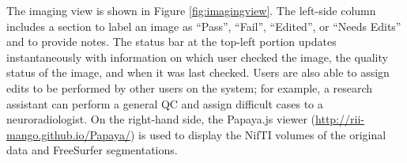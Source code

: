 The imaging view is shown in Figure \ref{fig:imagingview}. The left-side column includes a section to label an image as ``Pass'', ``Fail'', ``Edited'', or ``Needs Edits'' and to provide notes. The status bar at the top-left portion updates instantaneously with information on which user checked the image, the quality status of the image, and when it was last checked. Users are also able to assign edits to be performed by other users on the system; for example, a research assistant can perform a general QC and assign difficult cases to a neuroradiologist. On the right-hand side, the Papaya.js viewer (\href{http://rii-mango.github.io/Papaya/}{http://rii-mango.github.io/Papaya/}) is used to display the NifTI volumes of the original data and FreeSurfer segmentations. 
